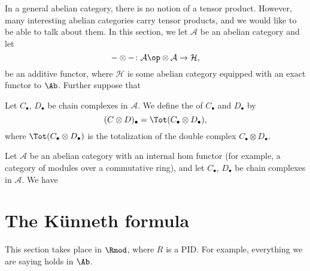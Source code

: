 \documentclass[main.tex]{subfiles}
\begin{document}
In a general abelian category, there is no notion of a tensor product. However, many interesting abelian categories carry tensor products, and we would like to be able to talk about them. In this section, we let $\mathcal{A}$ be an abelian category and let
\begin{equation*}
  -\otimes -\colon \mathcal{A}\op \otimes \mathcal{A} \to \mathcal{H},
\end{equation*}
be an additive functor, where $\mathcal{H}$ is some abelian category equipped with an exact functor to $\Ab$. Further suppose that

\begin{definition}
  \label{def:tensor_product_of_chain_complexes}
  Let $C_{\bullet}$, $D_{\bullet}$ be chain complexes in $\mathcal{A}$. We define the  of $C_{\bullet}$ and $D_{\bullet}$ by
  \begin{equation*}
    (C \otimes D)_{\bullet} = \Tot(C_{\bullet} \otimes D_{\bullet}),
  \end{equation*}
  where $\Tot(C_{\bullet} \otimes D_{\bullet})$ is the totalization of the double complex $C_{\bullet} \otimes D_{\bullet}$.
\end{definition}

\begin{definition}
  \label{def:internal_hom}
  Let $\mathcal{A}$ be an abelian category with an internal hom functor (for example, a category of modules over a commutative ring), and let $C_{\bullet}$, $D_{\bullet}$ be chain complexes in $\mathcal{A}$. We have
\end{definition}

\section{The Künneth formula}
\label{sec:the_kunneth_formula}

This section takes place in $\Rmod$, where $R$ is a PID. For example, everything we are saying holds in $\Ab$.
\end{document}
